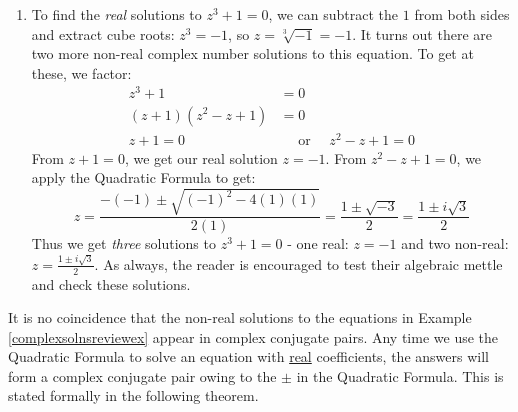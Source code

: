 {\begin{enumerate}

\item To find  the \textit{real} solutions to  $z^3 + 1 = 0$, we can subtract the $1$ from both sides and extract cube roots: $z^3 = -1$, so $z  = \sqrt[3]{-1} = -1$.  It turns out there are two more non-real complex number solutions to this equation.  To get at these, we factor:
\begin{align*}
z ^ 3 + 1 & =  0  \\
(z + 1)(z^2 - z + 1) & =  0  \tag*{Factor (Sum of Two Cubes)} \\
z + 1 = 0 & \quad \text{ or } \quad  z^2 - z + 1 = 0
\end{align*}
From $z+1 = 0$, we get our real solution $z = -1$.  From $z^2 -z + 1 = 0$, we apply the Quadratic Formula to get: 
\[
z = \dfrac{-(-1) \pm \sqrt{(-1)^2 - 4(1)(1)}}{2(1)} = \dfrac{1 \pm \sqrt{-3}}{2} = \dfrac{1 \pm i\sqrt{3}}{2}
\]
Thus we get \textit{three} solutions to $z^3 + 1 = 0$ - one real: $z = -1$ and two non-real: $z =  \frac{1 \pm i\sqrt{3}}{2}$.  As always, the reader is encouraged to test their algebraic mettle and check these solutions. 
		
\end{enumerate}
}


\medskip

It is no coincidence that the non-real solutions to the equations in Example \ref{complexsolnsreviewex} appear in  complex conjugate pairs. Any time we use the Quadratic Formula to solve an equation with \underline{real} coefficients, the answers will form a  complex conjugate pair owing to the $\pm$ in the Quadratic Formula.  This is stated formally in the following theorem.

\smallskip


